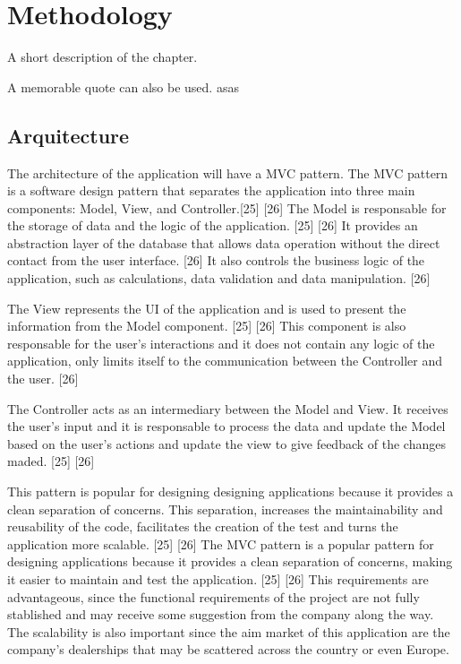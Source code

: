 \chapter{Methodology}%
\label{chapter:methodology}

\begin{introduction}
A short description of the chapter.

A memorable quote can also be used. asas
\end{introduction} 


\section{Arquitecture}

The architecture of the application will have a \ac{MVC} pattern. 
The \ac{MVC} pattern is a software design pattern that separates the application into three main components: Model, View, and Controller.[25] [26]
The Model is responsable for the storage of data and the logic of the application.  [25] [26]
It provides an abstraction layer of the database that allows data operation without the direct contact from the user interface. [26]
It also controls the business logic of the application, such as calculations, data validation and data manipulation. [26]

The View represents the \ac{UI} of the application and is used to present the information from the Model component. [25] [26]
This component is also responsable for the user's interactions and it does not contain any logic of the application, only limits itself to the communication between the Controller and the user. [26]

The Controller acts as an intermediary between the Model and View.
It receives the user's input and it is responsable to process the data and update the Model based on the user's actions and update the view to give feedback of the changes maded. [25] [26]

This pattern is popular for designing designing applications because it provides a clean separation of concerns. This separation, increases the maintainability and reusability of the code, facilitates the creation of the test and turns the application more scalable. [25] [26]
The \ac{MVC} pattern is a popular pattern for designing applications because it provides a clean separation of concerns, making it easier to maintain and test the application. [25] [26]
This requirements are advantageous, since the functional requirements of the project are not fully stablished and may receive some suggestion from the company along the way. 
The scalability is also important since the aim market of this application are the company's dealerships that may be scattered across the country or even Europe.

